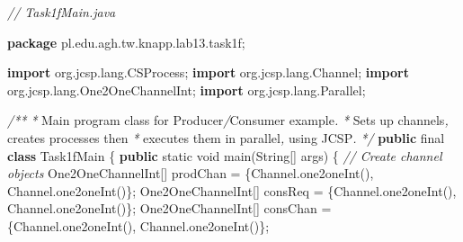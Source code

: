 \documentclass[11pt]{article}
\newenvironment{Shaded}{}{}
\newcommand{\KeywordTok}[1]{\textcolor[rgb]{0.00,0.44,0.13}{\textbf{{#1}}}}
\newcommand{\DataTypeTok}[1]{\textcolor[rgb]{0.56,0.13,0.00}{{#1}}}
\newcommand{\CommentTok}[1]{\textcolor[rgb]{0.38,0.63,0.69}{\textit{{#1}}}}
\newcommand{\FunctionTok}[1]{\textcolor[rgb]{0.02,0.16,0.49}{{#1}}}
\newcommand{\NormalTok}[1]{{#1}}
\newcommand{\ImportTok}[1]{{#1}}
\newcommand{\OperatorTok}[1]{\textcolor[rgb]{0.40,0.40,0.40}{{#1}}}
\newcommand{\BuiltInTok}[1]{{#1}}
\begin{document}
    \begin{Shaded}
\begin{Highlighting}[]
\CommentTok{// Task1fMain.java}

\KeywordTok{package}\ImportTok{ pl}\OperatorTok{.}\ImportTok{edu}\OperatorTok{.}\ImportTok{agh}\OperatorTok{.}\ImportTok{tw}\OperatorTok{.}\ImportTok{knapp}\OperatorTok{.}\ImportTok{lab13}\OperatorTok{.}\ImportTok{task1f}\OperatorTok{;}

\KeywordTok{import} \ImportTok{org}\OperatorTok{.}\ImportTok{jcsp}\OperatorTok{.}\ImportTok{lang}\OperatorTok{.}\ImportTok{CSProcess}\OperatorTok{;}
\KeywordTok{import} \ImportTok{org}\OperatorTok{.}\ImportTok{jcsp}\OperatorTok{.}\ImportTok{lang}\OperatorTok{.}\ImportTok{Channel}\OperatorTok{;}
\KeywordTok{import} \ImportTok{org}\OperatorTok{.}\ImportTok{jcsp}\OperatorTok{.}\ImportTok{lang}\OperatorTok{.}\ImportTok{One2OneChannelInt}\OperatorTok{;}
\KeywordTok{import} \ImportTok{org}\OperatorTok{.}\ImportTok{jcsp}\OperatorTok{.}\ImportTok{lang}\OperatorTok{.}\ImportTok{Parallel}\OperatorTok{;}

\CommentTok{/**}
 \CommentTok{*}\NormalTok{ Main program class for Producer}\CommentTok{/}\NormalTok{Consumer example}\CommentTok{.}
 \CommentTok{*}\NormalTok{ Sets up channels}\CommentTok{,}\NormalTok{ creates processes then}
 \CommentTok{*}\NormalTok{ executes them in parallel}\CommentTok{,}\NormalTok{ using JCSP}\CommentTok{.}
 \CommentTok{*/}
\KeywordTok{public} \DataTypeTok{final} \KeywordTok{class}\NormalTok{ Task1fMain }\OperatorTok{\{}
    \KeywordTok{public} \DataTypeTok{static} \DataTypeTok{void} \FunctionTok{main}\OperatorTok{(}\BuiltInTok{String}\OperatorTok{[]}\NormalTok{ args}\OperatorTok{)} \OperatorTok{\{}
        \CommentTok{// Create channel objects}
\NormalTok{        One2OneChannelInt}\OperatorTok{[]}\NormalTok{ prodChan }\OperatorTok{=} \OperatorTok{\{}\BuiltInTok{Channel}\OperatorTok{.}\FunctionTok{one2oneInt}\OperatorTok{(),} \BuiltInTok{Channel}\OperatorTok{.}\FunctionTok{one2oneInt}\OperatorTok{()\};}
\NormalTok{        One2OneChannelInt}\OperatorTok{[]}\NormalTok{ consReq }\OperatorTok{=} \OperatorTok{\{}\BuiltInTok{Channel}\OperatorTok{.}\FunctionTok{one2oneInt}\OperatorTok{(),} \BuiltInTok{Channel}\OperatorTok{.}\FunctionTok{one2oneInt}\OperatorTok{()\};}
\NormalTok{        One2OneChannelInt}\OperatorTok{[]}\NormalTok{ consChan }\OperatorTok{=} \OperatorTok{\{}\BuiltInTok{Channel}\OperatorTok{.}\FunctionTok{one2oneInt}\OperatorTok{(),} \BuiltInTok{Channel}\OperatorTok{.}\FunctionTok{one2oneInt}\OperatorTok{()\};}


\end{Highlighting}
\end{Shaded}
\end{document}
